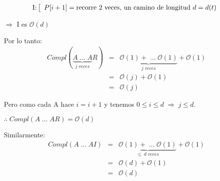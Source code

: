 \documentclass[12pt,a4paper]{report}
\begin{document}
		\begin{equation*}
			\textup{I:}
  			\left[
  			\begin{array}{l}
    		 P[i+1] = \textup{recorre 2 veces, un camino de longitud } d = d(t)
  			\end{array}
  			\right.
		\end{equation*}
		\begin{center}
			$\Rightarrow$ I es $\mathcal{O}(d)$
		\end{center}
		
		Por lo tanto:
		\begin{eqnarray}
			\nonumber Compl(\underbrace{A \; \dotsc \; A}_{j \; veces}R) & = & \underbrace{\mathcal{O}(1) + \; \dotsc \; \mathcal{O}(1)}_{j \; veces} + \mathcal{O}(1) \\
			\nonumber & = & \mathcal{O}(j) + \mathcal{O}(1) \\
			\nonumber & = & \mathcal{O}(j)
		\end{eqnarray}
		
		Pero como cada A hace $ i = i+1$ y tenemos $ 0 \leq \textit{i} \leq \textit{d} \; \Rightarrow \; \textit{j} \leq \textit{d}.$
		
		\begin{center}
			$\therefore \; Compl(A \; \dotsc \; AR) = \mathcal{O}(\textit{d})$
		\end{center}
		
		Similarmente: 		
		\begin{eqnarray}
			\nonumber Compl(A \; \dotsc \; AI) & = & \underbrace{\mathcal{O}(1) + \; \dotsc \; \mathcal{O}(1)}_{\leq \; d \; veces} + \mathcal{O}(1) \\
			\nonumber & = & \mathcal{O}(d) + \mathcal{O}(1) \\
			\nonumber & = & \mathcal{O}(d)
		\end{eqnarray}
				
\end{document}
